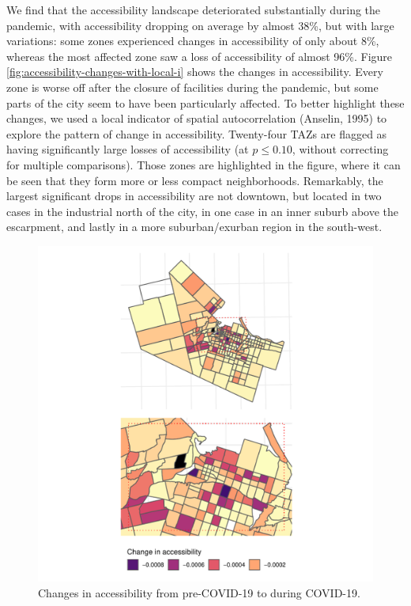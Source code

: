 \documentclass[]{elsarticle} %
\begin{document}
We find that the accessibility landscape deteriorated substantially
during the pandemic, with accessibility dropping on average by almost
38\%, but with large variations: some zones experienced changes in
accessibility of only about 8\%, whereas the most affected zone saw a
loss of accessibility of almost 96\%. Figure
\ref{fig:accessibility-changes-with-local-i} shows the changes in
accessibility. Every zone is worse off after the closure of facilities
during the pandemic, but some parts of the city seem to have been
particularly affected. To better highlight these changes, we used a
local indicator of spatial autocorrelation (Anselin, 1995) to explore
the pattern of change in accessibility. Twenty-four TAZs are flagged as
having significantly large losses of accessibility (at \(p\le 0.10\),
without correcting for multiple comparisons). Those zones are
highlighted in the figure, where it can be seen that they form more or
less compact neighborhoods. Remarkably, the largest significant drops in
accessibility are not downtown, but located in two cases in the
industrial north of the city, in one case in an inner suburb above the
escarpment, and lastly in a more suburban/exurban region in the
south-west.

\begin{figure}

{\centering \includegraphics[width=1\linewidth]{Accessibility-Foodbanks-Hamilton_files/figure-latex/plot-accessibility-changes-1} 

}

\caption{\label{fig:accessibility-changes}Changes in accessibility from pre-COVID-19 to during COVID-19.}\label{fig:plot-accessibility-changes}
\end{figure}
\end{document}
